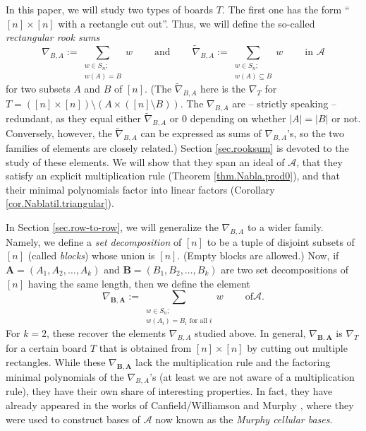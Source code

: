 \documentclass[numbers=enddot,12pt,final,onecolumn,notitlepage]{scrartcl}%
\numberwithin{exer}{subsection}
\theoremstyle{definition}
\let\sumnonlimits\sum
\renewcommand{\sum}{\sumnonlimits\limits}
\begin{document}
In this paper, we will study two types of boards $T$. The first one has the
form \textquotedblleft$\left[  n\right]  \times\left[  n\right]  $ with a
rectangle cut out\textquotedblright. Thus, we will define the so-called
\emph{rectangular rook sums}
\[
\nabla_{B,A}:=\sum_{\substack{w\in S_{n};\\w\left(  A\right)  =B}%
}w\ \ \ \ \ \ \ \ \ \ \text{and}\ \ \ \ \ \ \ \ \ \ \widetilde{\nabla}%
_{B,A}:=\sum_{\substack{w\in S_{n};\\w\left(  A\right)  \subseteq
B}}w\ \ \ \ \ \ \ \ \ \ \text{in }\mathcal{A}%
\]
for two subsets $A$ and $B$ of $\left[  n\right]  $. (The $\widetilde{\nabla
}_{B,A}$ here is the $\nabla_{T}$ for $T=\left(  \left[  n\right]
\times\left[  n\right]  \right)  \setminus\left(  A\times\left(  \left[
n\right]  \setminus B\right)  \right)  $. The $\nabla_{B,A}$ are -- strictly
speaking -- redundant, as they equal either $\widetilde{\nabla}_{B,A}$ or $0$
depending on whether $\left\vert A\right\vert =\left\vert B\right\vert $ or
not. Conversely, however, the $\widetilde{\nabla}_{B,A}$ can be expressed as
sums of $\nabla_{B,A}$'s, so the two families of elements are closely
related.) Section \ref{sec.rooksum} is devoted to the study of these elements.
We will show that they span an ideal of $\mathcal{A}$, that they satisfy an
explicit multiplication rule (Theorem \ref{thm.Nabla.prod0}), and that their
minimal polynomials factor into linear factors (Corollary
\ref{cor.Nablatil.triangular}).

In Section \ref{sec.row-to-row}, we will generalize the $\nabla_{B,A}$ to a
wider family. Namely, we define a \emph{set decomposition} of $\left[
n\right]  $ to be a tuple of disjoint subsets of $\left[  n\right]  $ (called
\emph{blocks}) whose union is $\left[  n\right]  $. (Empty blocks are
allowed.) Now, if $\mathbf{A}=\left(  A_{1},A_{2},\ldots,A_{k}\right)  $ and
$\mathbf{B}=\left(  B_{1},B_{2},\ldots,B_{k}\right)  $ are two set
decompositions of $\left[  n\right]  $ having the same length, then we define
the element%
\[
\nabla_{\mathbf{B},\mathbf{A}}:=\sum_{\substack{w\in S_{n};\\w\left(
A_{i}\right)  =B_{i}\text{ for all }i}}w\ \ \ \ \ \ \ \ \ \ \text{of
}\mathcal{A}.
\]
For $k=2$, these recover the elements $\nabla_{B,A}$ studied above. In
general, $\nabla_{\mathbf{B},\mathbf{A}}$ is $\nabla_{T}$ for a certain board
$T$ that is obtained from $\left[  n\right]  \times\left[  n\right]  $ by
cutting out multiple rectangles. While these $\nabla_{\mathbf{B},\mathbf{A}}$
lack the multiplication rule and the factoring minimal polynomials of the
$\nabla_{B,A}$'s (at least we are not aware of a multiplication rule), they
have their own share of interesting properties. In fact, they have already
appeared in the works of Canfield/Williamson \cite{CanWil89} and Murphy
\cite{Murphy92,Murphy95}, where they were used to construct bases of
$\mathcal{A}$ now known as the \emph{Murphy cellular bases}.
\end{document}
